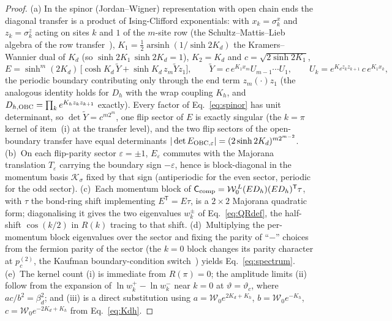 \documentclass[aps,prx,reprint,superscriptaddress,nobibnotes,longbibliography]{revtex4-2}
\theoremstyle{remark}
\newcommand{\vth}{\vartheta}
\newcommand{\Ccomp}{\mathsf C_{\rm comp}}
\begin{document}
\begin{proof}
(a) In the spinor (Jordan--Wigner) representation with open chain ends the diagonal transfer is a product of Ising-Clifford exponentials: with $x_k=\sigma^x_k$ and $z_k=\sigma^z_k$ acting on sites $k$ and $1$ of the $m$-site row (the Schultz--Mattis--Lieb algebra of the row transfer~\cite{Schultz1964}), $K_1=\tfrac12\operatorname{arsinh}(1/\sinh2K_d)$ the Kramers--Wannier dual of $K_d$ (so $\sinh2K_1\,\sinh2K_d=1$), $K_2=K_d$ and $c=\sqrt{2\sinh2K_1}$,
\begin{equation}
 E=\sinh^m(2K_d)\,\bigl[\cosh K_d\,\tilde Y+\sinh K_d\,z_m\tilde Yz_1\bigr],\qquad
 \tilde Y=c\,e^{K_1x_m}U_{m-1}\cdots U_1,\qquad
 U_k=e^{K_dz_kz_{k+1}}\,c\,e^{K_1x_k},
 \label{eq:spinor}
\end{equation}
the periodic boundary contributing only through the end term $z_m(\cdot)z_1$ (the analogous identity holds for $D_h$ with the wrap coupling $K_h$, and $D_{h,\rm OBC}=\prod_ke^{K_hz_kz_{k+1}}$ exactly).  Every factor of Eq.~\eqref{eq:spinor} has unit determinant, so $\det\tilde Y=c^{m2^m}$, one flip sector of $E$ is exactly singular (the $k=\pi$ kernel of item~(i) at the transfer level), and the two flip sectors of the open-boundary transfer have equal determinants $|\det E_{\rm OBC,\varepsilon}|=(2\sinh2K_d)^{m2^{m-2}}$.  (b)~On each flip-parity sector $\varepsilon=\pm1$, $E_\varepsilon$ commutes with the Majorana translation $T_\varepsilon$ carrying the boundary sign $-\varepsilon$, hence is block-diagonal in the momentum basis $\mathcal K_\sigma$ fixed by that sign (antiperiodic for the even sector, periodic for the odd sector).  (c)~Each momentum block of $\Ccomp=\mathcal W_0^{\,L}(ED_h)(ED_h)^{\mathsf T}\tau$, with $\tau$ the bond-ring shift implementing $E^{\mathsf T}=E\tau$, is a $2\times2$ Majorana quadratic form; diagonalising it gives the two eigenvalues $w_k^\pm$ of Eq.~\eqref{eq:QRdef}, the half-shift $\cos(k/2)$ in $R(k)$ tracing to that shift.  (d)~Multiplying the per-momentum block eigenvalues over the sector and fixing the parity of ``$-$'' choices from the fermion parity of the sector (the $k=0$ block changes its parity character at $p_c^{(2)}$, the Kaufman boundary-condition switch~\cite{Kaufman1949}) yields Eq.~\eqref{eq:spectrum}.  (e)~The kernel count (i) is immediate from $R(\pi)=0$; the amplitude limits (ii) follow from the expansion of $\ln w_k^+-\ln w_k^-$ near $k=0$ at $\vth=\vth_c$, where $ac/b^2=\beta_d^2$; and (iii) is a direct substitution using $a=\mathcal W_0e^{2K_d+K_h}$, $b=\mathcal W_0e^{-K_h}$, $c=\mathcal W_0e^{-2K_d+K_h}$ from Eq.~\eqref{eq:Kdh}.
\end{proof}
\end{document}

